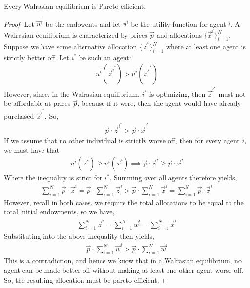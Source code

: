 \begin{theorem*}
    Every Walrasian equilibrium is Pareto efficient. 
\end{theorem*}
\begin{proof}
    Let $\vec{w}^i$ be the endowents and let $u^i$ be the utility function for agent $i$. A Walrasian equilibrium is characterized by prices $\vec{p}$ and allocations $\{\vec{x}^i\}_{i = 1}^N$. Suppose we have some alternative allocation $\{\vec{z}^i\}_{i = 1}^N$ where at least one agent is strictly better off. Let $i^*$ be such an agent: 
    \begin{align*}
        u^i(\vec{z}^{i^*}) > u^i(\vec{x}^{i^*})
    \end{align*}
    However, since, in the Walrasian equilibrium, $i^*$ is optimizing, then $\vec{z}^{i^*}$ must not be affordable at prices $\vec{p}$, because if it were, then the agent would have already purchased $\vec{z}^{i^*}$. So,
    \begin{align*}
        \vec{p} \cdot \vec{z}^{i^*} > \vec{p} \cdot \vec{x}^{i^*}
    \end{align*}
    If we assume that no other individual is strictly worse off, then for every agent $i$, we must have that
    \begin{align*}
        u^i(\vec{z}^i) \geq u^i(\vec{x}^i) \implies \vec{p} \cdot \vec{z}^i \geq \vec{p} \cdot \vec{x}^i
    \end{align*}
    Where the inequality is strict for $i^*$. Summing over all agents therefore yields,
    \begin{align*}
        \sum_{i = 1}^N \vec{p} \cdot \vec{z}^i = \vec{p} \cdot \sum_{i = 1}^N \vec{z}^i > \vec{p} \cdot \sum_{i = 1}^N \vec{x}^i = \sum_{i = 1}^N \vec{p} \cdot \vec{x}^i
    \end{align*}
    However, recall in both cases, we require the total allocations to be equal to the total initial endowments, so we have,
    \begin{align*}
        \sum_{i = 1}^N \vec{z}^i = \sum_{i = 1}^N \vec{w}^i = \sum_{i = 1}^N \vec{x}^i
    \end{align*}
    Substituting into the above inequality then yields,
    \begin{align*}
        \vec{p} \cdot \sum_{i = 1}^N \vec{w}^i > \vec{p} \cdot \sum_{i = 1}^N \vec{w}^i
    \end{align*}
    This is a contradiction, and hence we know that in a Walrasian equilibrium, no agent can be made better off without making at least one other agent worse off. So, the resulting allocation must be pareto efficient. 
    
\end{proof}